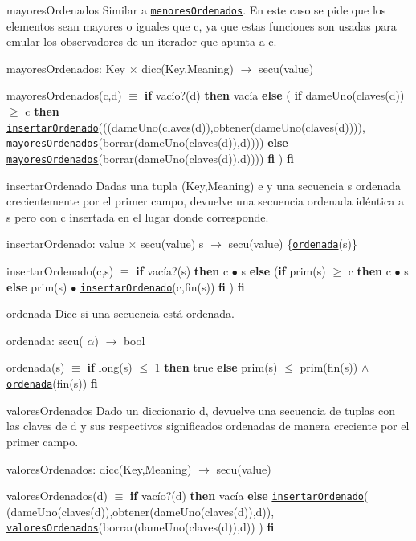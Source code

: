 \begin{DoxyParagraph}{mayores\-Ordenados}
Similar a \href{axiomas.html#menoresOrdenados}{\tt menores\-Ordenados}. En este caso se pide que los elementos sean mayores o iguales que c, ya que estas funciones son usadas para emular los observadores de un iterador que apunta a c.

mayores\-Ordenados\-: Key $\times$ dicc(\-Key,\-Meaning) $\to$ secu(value) \par
mayores\-Ordenados(c,d) $\equiv$ {\bfseries if} vacío?(d) {\bfseries then} vacía {\bfseries else} ( {\bfseries if} dame\-Uno(claves(d)) $\geq$ c {\bfseries then} \href{axiomas.html#insertarOrdenado}{\tt insertar\-Ordenado}(((dame\-Uno(claves(d)),obtener(dame\-Uno(claves(d)))), \href{axiomas.html#mayoresOrdenados}{\tt mayores\-Ordenados}(borrar(dame\-Uno(claves(d)),d)))) {\bfseries else} \href{axiomas.html#mayoresOrdenados}{\tt mayores\-Ordenados}(borrar(dame\-Uno(claves(d)),d)))) {\bfseries fi} ) {\bfseries fi} 


\end{DoxyParagraph}
\begin{DoxyParagraph}{insertar\-Ordenado}
Dadas una tupla (Key,Meaning) e y una secuencia s ordenada crecientemente por el primer campo, devuelve una secuencia ordenada idéntica a s pero con c insertada en el lugar donde corresponde.

insertar\-Ordenado\-: value $\times$ secu(value) s $\to$ secu(value) \{\href{axiomas.html#ordenada}{\tt ordenada}(s)\} \par
insertar\-Ordenado(c,s) $\equiv$ {\bfseries if} vacía?(s) {\bfseries then} c $\bullet$ s {\bfseries else} ({\bfseries if} prim(s) $\geq$ c {\bfseries then} c $\bullet$ s {\bfseries else} prim(s) $\bullet$ \href{axiomas.html#insertarOrdenado}{\tt insertar\-Ordenado}(c,fin(s)) {\bfseries fi} ) {\bfseries fi} 


\end{DoxyParagraph}
\begin{DoxyParagraph}{ordenada}
Dice si una secuencia está ordenada.

ordenada\-: secu( $\alpha$) $\to$ bool \par
ordenada(s) $\equiv$ {\bfseries if} long(s) $\leq$ 1 {\bfseries then} true {\bfseries else} prim(s) $\leq$ prim(fin(s)) $\land$ \href{axiomas.html#ordenada}{\tt ordenada}(fin(s)) {\bfseries fi} 


\end{DoxyParagraph}
\begin{DoxyParagraph}{valores\-Ordenados}
Dado un diccionario d, devuelve una secuencia de tuplas con las claves de d y sus respectivos significados ordenadas de manera creciente por el primer campo.

valores\-Ordenados\-: dicc(\-Key,\-Meaning) $\to$ secu(value) \par
valores\-Ordenados(d) $\equiv$ {\bfseries if} vacío?(d) {\bfseries then} vacía {\bfseries else} \href{axiomas.html#insertarOrdenado}{\tt insertar\-Ordenado}( (dame\-Uno(claves(d)),obtener(dame\-Uno(claves(d)),d)), \href{axiomas.html#valoresOrdenados}{\tt valores\-Ordenados}(borrar(dame\-Uno(claves(d)),d)) ) {\bfseries fi} 


\end{DoxyParagraph}
